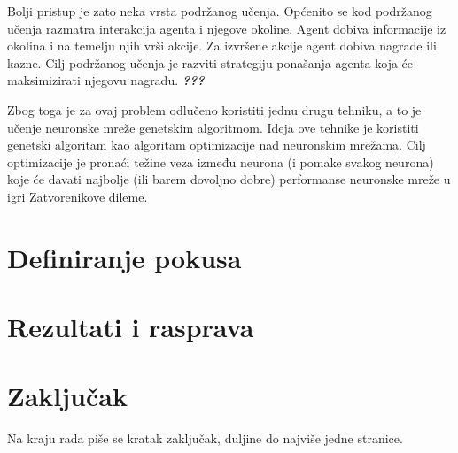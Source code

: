 \documentclass[zavrsnirad]{fer}
\begin{document}
	Bolji pristup je zato neka vrsta podržanog učenja. Općenito se kod podržanog učenja razmatra interakcija agenta i njegove okoline. Agent dobiva informacije iz okolina i na temelju njih vrši akcije. Za izvršene akcije agent dobiva nagrade ili kazne. Cilj podržanog učenja je razviti strategiju ponašanja agenta koja će maksimizirati njegovu nagradu. \textit{\textbf{???}}
	
	Zbog toga je za ovaj problem odlučeno koristiti jednu drugu tehniku, a to je učenje neuronske mreže genetskim algoritmom. Ideja ove tehnike je koristiti genetski algoritam kao algoritam optimizacije nad neuronskim mrežama. Cilj optimizacije je pronaći težine veza između neurona (i pomake svakog neurona) koje će davati najbolje (ili barem dovoljno dobre) performanse neuronske mreže u igri Zatvorenikove dileme.
	
	
	
\chapter{Definiranje pokusa}





\chapter{Rezultati i rasprava}
\label{pog:rezultati_i_rasprava}



\chapter{Zaključak}
\label{pog:zakljucak}

Na kraju rada piše se kratak zaključak, duljine do najviše jedne stranice. 







\end{document}
